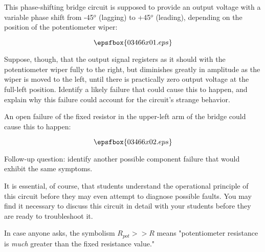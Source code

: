 

This phase-shifting bridge circuit is supposed to provide an output voltage with a variable phase shift from -45$^{o}$ (lagging) to +45$^{o}$ (leading), depending on the position of the potentiometer wiper:

$$\epsfbox{03466x01.eps}$$

Suppose, though, that the output signal registers as it should with the potentiometer wiper fully to the right, but diminishes greatly in amplitude as the wiper is moved to the left, until there is practically zero output voltage at the full-left position.  Identify a likely failure that could cause this to happen, and explain why this failure could account for the circuit's strange behavior.







An open failure of the fixed resistor in the upper-left arm of the bridge could cause this to happen:

$$\epsfbox{03466x02.eps}$$

\vskip 10pt

Follow-up question: identify another possible component failure that would exhibit the same symptoms.







It is essential, of course, that students understand the operational principle of this circuit before they may even attempt to diagnose possible faults.  You may find it necessary to discuss this circuit in detail with your students before they are ready to troubleshoot it.

In case anyone asks, the symbolism $R_{pot} >> R$ means "potentiometer resistance is {\it much} greater than the fixed resistance value."




